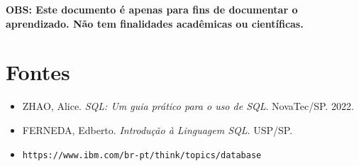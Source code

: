 \documentclass[12pt,a4paper]{article}
\begin{document}
\textbf{OBS: Este documento é apenas para fins de documentar o aprendizado. Não tem finalidades acadêmicas ou científicas.}

\section*{Fontes}

\begin{itemize}
    \item ZHAO, Alice. \textit{SQL: Um guia prático para o uso de SQL}. NovaTec/SP. 2022.
    
    \item FERNEDA, Edberto. \textit{Introdução à Linguagem SQL}. USP/SP.
    
    \item \texttt{https://www.ibm.com/br-pt/think/topics/database}
\end{itemize}
\end{document}
